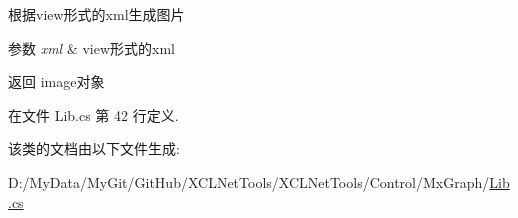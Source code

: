 根据view形式的xml生成图片 


\begin{DoxyParams}{参数}
{\em xml} & view形式的xml\\
\hline
\end{DoxyParams}
\begin{DoxyReturn}{返回}
image对象
\end{DoxyReturn}


在文件 Lib.\-cs 第 42 行定义.



该类的文档由以下文件生成\-:\begin{DoxyCompactItemize}
\item 
D\-:/\-My\-Data/\-My\-Git/\-Git\-Hub/\-X\-C\-L\-Net\-Tools/\-X\-C\-L\-Net\-Tools/\-Control/\-Mx\-Graph/\hyperlink{_control_2_mx_graph_2_lib_8cs}{Lib.\-cs}\end{DoxyCompactItemize}
